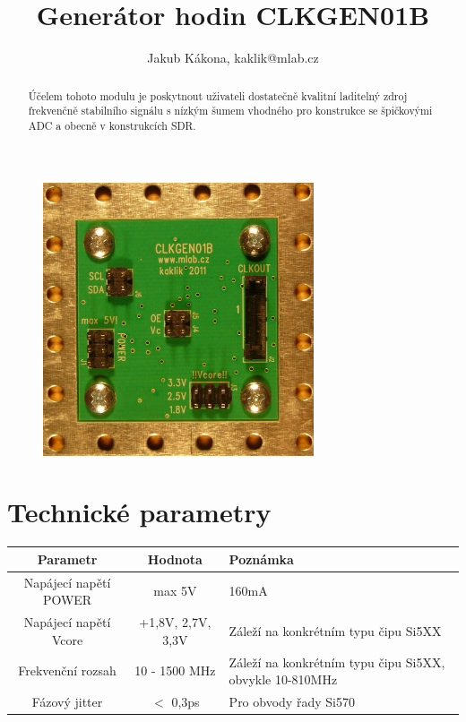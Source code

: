 \documentclass[12pt,a4paper,oneside]{article}
\begin{document}
\title{Generátor hodin CLKGEN01B}
\author{Jakub Kákona, kaklik@mlab.cz}
\maketitle

\thispagestyle{empty}
\begin{abstract}
Účelem tohoto modulu je poskytnout uživateli dostatečně kvalitní laditelný zdroj frekvenčně stabilního signálu s nízkým šumem vhodného pro konstrukce se špičkovými ADC a obecně v konstrukcích SDR.
\end{abstract}

\begin{figure} [htbp]
\begin{center}
\includegraphics [width=80mm] {CLKGEN01B_Top_Big.jpg} 
\end{center}
\end{figure}

\tableofcontents

\section{Technické parametry}
\begin{table}[htbp]
\begin{center}
\begin{tabular}{|c|c|p{4.7cm}|}
\hline
Parametr & Hodnota & Poznámka \\
\hline
Napájecí napětí POWER  & max 5V &  160mA \\ 
\hline
Napájecí napětí Vcore & +1,8V, 2,7V, 3,3V &  Záleží na konkrétním typu čipu Si5XX \\ 
\hline
Frekvenční rozsah  & 10 - 1500 MHz & Záleží na konkrétním typu čipu Si5XX, obvykle 10-810MHz \\ 
\hline
Fázový jitter  & $<$ 0,3ps & Pro obvody řady Si570 \\ 
\hline
\end{tabular}
\end{center}
\end{table}
\end{document}
